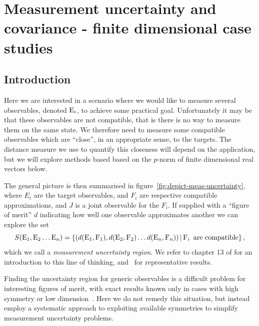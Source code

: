 \chapter{Measurement uncertainty and covariance - finite dimensional case studies}
\label{chap:cov-meas-ur}
\section{Introduction}

Here we are interested in a scenario where we would like to measure several observables, denoted $\operatorname{E}_i$, to achieve some practical goal. Unfortunately it may be that these observables are not compatible, that is there is no way to measure them on the same state. We therefore need to measure some compatible observables which are ``close'', in an appropriate sense, to the targets. The distance measure we use to quantify this closeness will depend on the application, but we will explore methods based based on the $p$-norm of finite dimensional real vectors below. 

The general picture is then summarised in figure~\ref{fig:depict-meas-uncertainty}, where $E_i$ are the target observables, and $F_i$ are respective compatible approximations, and $J$ is a joint observable for the $F_i$. If supplied with a ``figure of merit'' $d$ indicating how well one observable approximates another we can explore the set
\begin{equation}
  S(\operatorname{E}_1, \operatorname{E}_2\hdots \operatorname{E}_n) = \left\{(d(\operatorname{E}_1, \operatorname{F}_1), d(\operatorname{E}_2, \operatorname{F}_2)\hdots d(\operatorname{E}_n, \operatorname{F}_n))\,\middle|\,\operatorname{F}_i \text{ are compatible}\right\},
  \label{eqn:general-ur-definition}
\end{equation}
which we call a \emph{measurement uncertainty region}. We refer to chapter 13 of \cite{quantum-measurement-busch-et-al} for an introduction to this line of thinking, and~\cites{blw-meas-uncertainty}{srw-meas-uncertainty-finite} for representative results. 

Finding the uncertainty region for generic observables is a difficult problem for interesting figures of merit, with exact results known only in cases with high symmetry or low dimension~\cites{yu-oh-qubit}{dsw-meas-ur-ang-mom}. Here we do not remedy this situation, but instead employ a systematic approach to exploiting available symmetries to simplify measurement uncertainty problems. 

